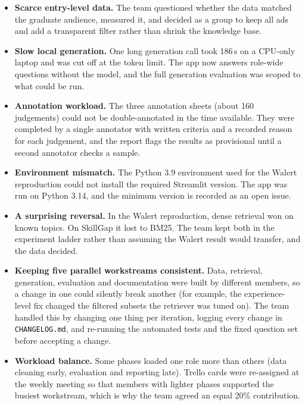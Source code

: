 \begin{itemize}
  \item \textbf{Scarce entry-level data.} The team questioned whether the data matched the graduate audience, measured it, and decided as a group to keep all ads and add a transparent filter rather than shrink the knowledge base.
  \item \textbf{Slow local generation.} One long generation call took 186\,s on a CPU-only laptop and was cut off at the token limit. The app now answers role-wide questions without the model, and the full generation evaluation was scoped to what could be run.
  \item \textbf{Annotation workload.} The three annotation sheets (about 160 judgements) could not be double-annotated in the time available. They were completed by a single annotator with written criteria and a recorded reason for each judgement, and the report flags the results as provisional until a second annotator checks a sample.
  \item \textbf{Environment mismatch.} The Python 3.9 environment used for the Walert reproduction could not install the required Streamlit version. The app was run on Python 3.14, and the minimum version is recorded as an open issue.
  \item \textbf{A surprising reversal.} In the Walert reproduction, dense retrieval won on known topics. On SkillGap it lost to BM25. The team kept both in the experiment ladder rather than assuming the Walert result would transfer, and the data decided.
  \item \textbf{Keeping five parallel workstreams consistent.} Data, retrieval, generation, evaluation and documentation were built by different members, so a change in one could silently break another (for example, the experience-level fix changed the filtered subsets the retriever was tuned on). The team handled this by changing one thing per iteration, logging every change in \texttt{CHANGELOG.md}, and re-running the automated tests and the fixed question set before accepting a change.
  \item \textbf{Workload balance.} Some phases loaded one role more than others (data cleaning early, evaluation and reporting late). Trello cards were re-assigned at the weekly meeting so that members with lighter phases supported the busiest workstream, which is why the team agreed an equal 20\% contribution.
\end{itemize}
